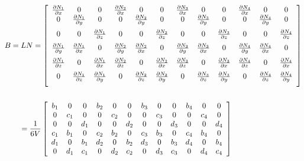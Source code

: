 \begin{equation}
\label{eq:strain_interpolation_matrix}
\begin{aligned}
B &= L N = \left[
\begin{array}{cccccccccccc}
  \frac{\partial N_1}{\partial x} & 0 & 0 &
  \frac{\partial N_2}{\partial x} & 0 & 0 &
  \frac{\partial N_3}{\partial x} & 0 & 0 &
  \frac{\partial N_4}{\partial x} & 0 & 0 \\
\vspace{2mm}
  0 & \frac{\partial N_1}{\partial y} & 0 &
  0 & \frac{\partial N_2}{\partial y} & 0 &
  0 & \frac{\partial N_3}{\partial y} & 0 &
  0 & \frac{\partial N_4}{\partial y} & 0 \\
\vspace{2mm}
  0 & 0 & \frac{\partial N_1}{\partial z} &
  0 & 0 & \frac{\partial N_2}{\partial z} &
  0 & 0 & \frac{\partial N_3}{\partial z} &
  0 & 0 & \frac{\partial N_4}{\partial z} \\
\vspace{2mm}
  \frac{\partial N_1}{\partial y} & \frac{\partial N_1}{\partial x}  & 0 &
  \frac{\partial N_2}{\partial y} & \frac{\partial N_2}{\partial x}  & 0 &
  \frac{\partial N_3}{\partial y} & \frac{\partial N_3}{\partial x}  & 0 &
  \frac{\partial N_4}{\partial y} & \frac{\partial N_4}{\partial x}  & 0 \\
\vspace{2mm}
  \frac{\partial N_1}{\partial z} & 0 & \frac{\partial N_1}{\partial x} &
  \frac{\partial N_2}{\partial z} & 0 & \frac{\partial N_2}{\partial x} &
  \frac{\partial N_3}{\partial z} & 0 & \frac{\partial N_3}{\partial x} &
  \frac{\partial N_4}{\partial z} & 0 & \frac{\partial N_4}{\partial x} \\
\vspace{2mm}
  0 & \frac{\partial N_1}{\partial z} & \frac{\partial N_1}{\partial y} &
  0 & \frac{\partial N_2}{\partial z} & \frac{\partial N_2}{\partial y} &
  0 & \frac{\partial N_3}{\partial z} & \frac{\partial N_3}{\partial y} &
  0 & \frac{\partial N_4}{\partial z} & \frac{\partial N_4}{\partial y}
\end{array}
\right] \\ \\
& \hspace{4mm} = \frac{1}{6V} \left[
\begin{array}{cccccccccccc} 
b_1 & 0 & 0 &
b_2 & 0 & 0 &
b_3 & 0 & 0 &
b_4 & 0 & 0 \\

0 & c_1 & 0 &
0 & c_2 & 0 &
0 & c_3 & 0 &
0 & c_4 & 0 \\

0 & 0 & d_1 &
0 & 0 & d_2 &
0 & 0 & d_3 &
0 & 0 & d_4 \\

c_1 & b_1 & 0 &
c_2 & b_2 & 0 &
c_3 & b_3 & 0 &
c_4 & b_4 & 0 \\

d_1 & 0 & b_1 &
d_2 & 0 & b_2 &
d_3 & 0 & b_3 &
d_4 & 0 & b_4 \\

0 & d_1 & c_1 &
0 & d_2 & c_2 &
0 & d_3 & c_3 &
0 & d_4 & c_4 
\end{array}
\right]
\end{aligned}
\end{equation}


